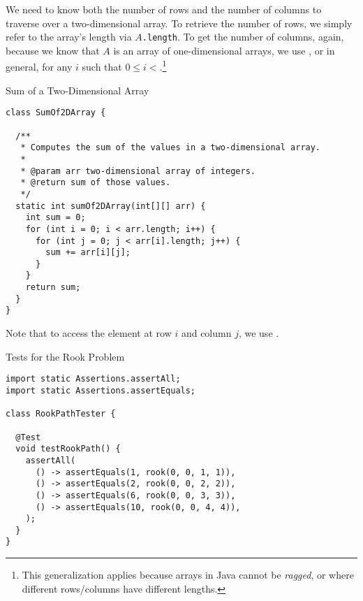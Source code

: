 We need to know both the number of rows and the number of columns to traverse over a two-dimensional array. To retrieve the number of rows, we simply refer to the array's length via \texttt{$A$.length}. To get the number of columns, again, because we know that $A$ is an array of one-dimensional arrays, we use , or in general,  for any $i$ such that $0 \leq i < $.\footnote{This generalization applies because arrays in Java cannot be \textit{ragged}, or where different rows/columns have different lengths.}

\begin{cl}{Sum of a Two-Dimensional Array}
\begin{lstlisting}[language=MyJava]
class SumOf2DArray {

  /**
   * Computes the sum of the values in a two-dimensional array.
   *
   * @param arr two-dimensional array of integers.
   * @return sum of those values.
   */
  static int sumOf2DArray(int[][] arr) {
    int sum = 0;
    for (int i = 0; i < arr.length; i++) {
      for (int j = 0; j < arr[i].length; j++) {
        sum += arr[i][j];
      }
    }
    return sum;
  }
}
\end{lstlisting}
\end{cl}

Note that to access the element at row $i$ and column $j$, we use . 


\begin{cl}{Tests for the Rook Problem}
\begin{lstlisting}[language=MyJava]
import static Assertions.assertAll;
import static Assertions.assertEquals;

class RookPathTester {

  @Test
  void testRookPath() {
    assertAll(
      () -> assertEquals(1, rook(0, 0, 1, 1)),
      () -> assertEquals(2, rook(0, 0, 2, 2)),
      () -> assertEquals(6, rook(0, 0, 3, 3)),
      () -> assertEquals(10, rook(0, 0, 4, 4)),
    );
  }
}
\end{lstlisting}
\end{cl}

